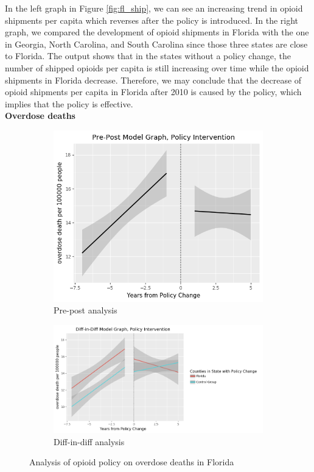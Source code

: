 \documentclass[12pt,letterpaper]{article}
\begin{document}
In the left graph in Figure \ref{fig:fl_ship}, we can see an increasing trend in opioid shipments per capita which reverses after the policy is introduced. In the right graph, we compared the development of opioid shipments in Florida with the one in Georgia, North Carolina, and South Carolina since those three states are close to Florida. The output shows that in the states without a policy change, the number of shipped opioids per capita is still increasing over time while the opioid shipments in Florida decrease. Therefore, we may conclude that the decrease of opioid shipments per capita in Florida after 2010 is caused by the policy, which implies that the policy is effective. \\

\noindent \textbf{Overdose deaths} \\

\begin{figure}[!h]
\centering
\begin{subfigure}{.5\textwidth}
  \centering
  \includegraphics[width=0.7\linewidth]{../30_results/General_Results/florida_overdose_death_prepost.png}
  \caption{Pre-post analysis}
  \label{fig:fl_death_prepost}
\end{subfigure}%
\begin{subfigure}{.55\textwidth}
  \centering
  \includegraphics[width=1\linewidth]{../30_results/General_Results/florida_overdose_death_diffdiff.png}
  \caption{Diff-in-diff analysis}
  \label{fig:fl_death_did}
\end{subfigure}
\caption{Analysis of opioid policy on overdose deaths in Florida}
\label{fig:fl_death}
\end{figure}
\end{document}
